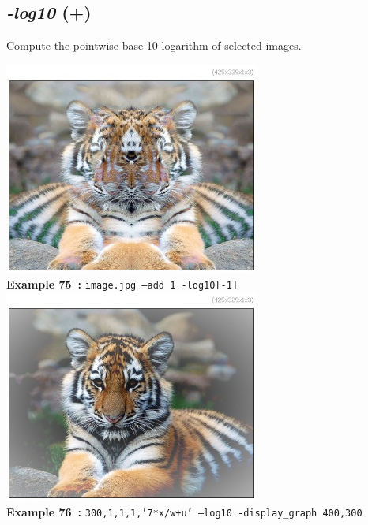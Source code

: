 \documentclass[a4paper,11pt,twoside]{book}
\begin{document}
\subsection{\emph{-log10} (+)}\vspace*{-0.5em}
Compute the pointwise base-10 logarithm of selected images.
\begin{center}\includegraphics[keepaspectratio=true,height=7cm,width=\textwidth]{img/gmic_def75.jpg}\\
{\footnotesize \textbf{Example 75~:} \texttt{image.jpg --add 1 -log10[-1]}}
\\\includegraphics[keepaspectratio=true,height=7cm,width=\textwidth]{img/gmic_def76.jpg}\\
{\footnotesize \textbf{Example 76~:} \texttt{300,1,1,1,'7*x/w+u' --log10 -display\_graph 400,300}}
\end{center}
\end{document}
